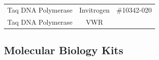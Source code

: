 \documentclass[11pt,singlespacinge,twoside]{reedthesis} %
\begin{document}
\begin{longtable}[]{@{}rcl@{}}
\begin{minipage}[t]{0.25\columnwidth}
Taq DNA Polymerase\strut
\end{minipage} & \begin{minipage}[t]{0.50\columnwidth}\centering
Invitrogen\strut
\end{minipage} & \begin{minipage}[t]{0.16\columnwidth}\raggedright
\#10342-020\strut
\end{minipage}\tabularnewline
\begin{minipage}[t]{0.25\columnwidth}\raggedleft
Taq DNA Polymerase\strut
\end{minipage} & \begin{minipage}[t]{0.50\columnwidth}\centering
VWR\strut
\end{minipage} & \begin{minipage}[t]{0.16\columnwidth}\raggedright
\strut
\end{minipage}\tabularnewline
\bottomrule
\end{longtable}
\hypertarget{mat-mobikits}{%
\subsection{Molecular Biology Kits}\label{mat-mobikits}}
\end{document}
